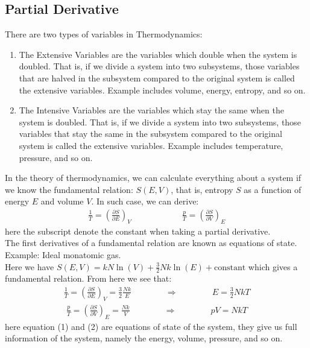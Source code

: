 \documentclass[11pt,oneside]{book}
\theoremstyle{break}
\theoremstyle{break}
\newcommand{\example}{\color{green}Example: \color{black}}
\begin{document}
\subsection{Partial Derivative}
There are two types of variables in Thermodynamics: 
\begin{enumerate}
\item The Extensive Variables are the variables which double when the system is doubled. That is, if we divide a system into two subsystems, those variables that are halved in the subsystem compared to the original system is called the extensive variables. Example includes volume, energy, entropy, and so on.
\item The Intensive Variables are the variables which stay the same when the system is doubled.  That is, if we divide a system into two subsystems, those variables that stay the same in the subsystem compared to the original system is called the extensive variables. Example includes temperature, pressure, and so on.
\end{enumerate}

In the theory of thermodynamics, we can calculate everything about a system if we know the fundamental relation: $S(E,V)$, that is, entropy $S$ as a function of energy $E$ and volume $V$. In such case, we can derive:
\begin{align*}
\frac{1}{T} = \left( \frac{\partial S}{\partial E}\right)_V \qquad\qquad\qquad \frac{p}{T} = \left( \frac{\partial S}{\partial V}\right)_E
\end{align*}
here the subscript denote the constant when taking a partial derivative. \\

The first derivatives of a fundamental relation are known as equations of state.\\

\example Ideal monatomic gas.\\
Here we have $S(E,V) = kN\ln(V) +\frac{3}{2}Nk \ln(E)+ \text{constant}$ which gives a fundamental relation. From here we see that:
\begin{align*}
\frac{1}{T} =  \left( \frac{\partial S}{\partial E}\right)_V = \frac{3}{2}\frac{Nk}{E} \qquad\qquad \Rightarrow\qquad\qquad E = \frac{3}{2}NkT \tag{1}
\end{align*}
\begin{align*}
\frac{p}{T} = \left( \frac{\partial S}{\partial V}\right)_E = \frac{Nk}{V} \qquad\qquad \Rightarrow\qquad\qquad pV = NkT \tag{2}
\end{align*}
here equation (1) and (2) are equations of state of the system, they give us full information of the system, namely the energy, volume, pressure, and so on. \\
\end{document}

